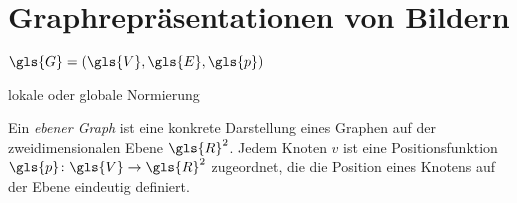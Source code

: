 \chapter{Graphrepräsentationen von Bildern}
\label{graphrepraesentationen_von_bildern}

$\gls{G} = \left(\gls{V}, \gls{E}, \gls{p}\right)$

lokale oder globale Normierung

Ein \emph{ebener Graph} ist eine konkrete Darstellung eines Graphen auf der zweidimensionalen Ebene $\gls{R}^2$.
Jedem Knoten $v$ ist eine Positionsfunktion $\gls{p} \colon \gls{V} \to \gls{R}^2$ zugeordnet, die die Position eines Knotens auf der Ebene eindeutig definiert.





